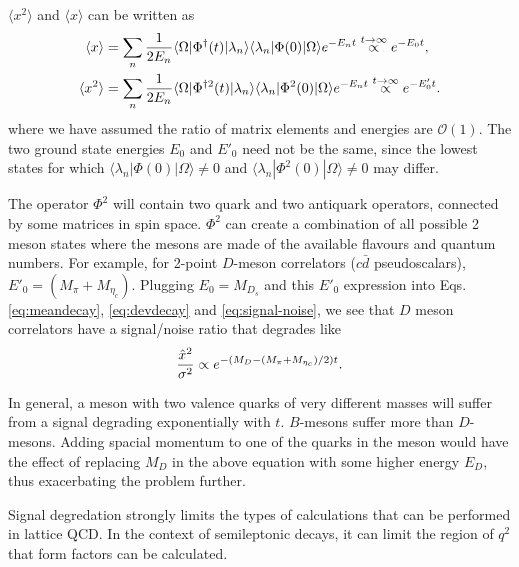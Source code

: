 $\langle x^2 \rangle$ and $\langle x \rangle$ can be written as
\begin{align}
  \label{eq:meandecay}
  \langle x \rangle &= \sum_n {1\over 2E_n} \langle \Omega | \Phi^{\dagger}(t) | \lambda_n \rangle \langle \lambda_n | \Phi(0) | \Omega \rangle e^{-E_n t} \stackrel{t\to\infty}{\propto} e^{-E_0 t}, \\
  \langle x^2 \rangle &= \sum_n {1\over 2E_n} \langle \Omega | \Phi^{\dagger 2}(t) | \lambda_n \rangle \langle \lambda_n | \Phi^2(0) | \Omega \rangle e^{-E_n t} \stackrel{t\to\infty}{\propto} e^{-E'_0 t}.
  \label{eq:devdecay}
\end{align}
where we have assumed the ratio of matrix elements and energies are $\mathcal{O}(1)$. The two ground state energies $E_0$ and $E'_0$ need not be the same, since the lowest states for which $\langle \lambda_n | \Phi(0) | \Omega \rangle \neq 0$ and $\langle \lambda_n | \Phi^2(0) | \Omega \rangle \neq 0$ may differ.

The operator $\Phi^2$ will contain two quark and two antiquark operators, connected by some matrices in spin space. $\Phi^2$ can create a combination of all possible 2 meson states where the mesons are made of the available flavours and quantum numbers. For example, for 2-point $D$-meson correlators ($c\bar{d}$ pseudoscalars), $E'_0 = (M_{\pi}+M_{\eta_c})$. Plugging $E_0=M_{D_s}$ and this $E'_0$ expression into Eqs. \eqref{eq:meandecay}, \eqref{eq:devdecay} and \eqref{eq:signal-noise}, we see that $D$ meson correlators have a signal/noise ratio that degrades like
\begin{align}
  {\hat{x}^2\over \sigma^2} \propto e^{-(M_{D}-(M_{\pi}+M_{\eta_c})/2)t}.
\end{align}

In general, a meson with two valence quarks of very different masses will suffer from a signal degrading exponentially with $t$. $B$-mesons suffer more than $D$-mesons. Adding spacial momentum to one of the quarks in the meson would have the effect of replacing $M_D$ in the above equation with some higher energy $E_D$, thus exacerbating the problem further.

Signal degredation strongly limits the types of calculations that can be performed in lattice QCD. In the context of semileptonic decays, it can limit the region of $q^2$ that form factors can be calculated.


